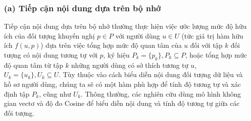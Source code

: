 \subsubsection*{(a) Tiếp cận nội dung dựa trên bộ nhớ}
Tiếp cận nội dung dựa trên bộ nhớ thường thực hiện việc ước lượng mức độ hữu ích của đối tượng khuyến nghị $p \in P$ với người dùng $u \in U$ (tức giá trị hàm hữu ích $f(u,p)$) dựa trên việc tổng hợp mức độ quan tâm của $u$ đối với tập $k$ đối tượng có nội dung tương tự với $p$, ký hiệu $P_{k} = \{p_{k}\}, P_{k} \subseteq P$, hoặc tổng hợp mức độ quan tâm từ tập $k$ những người dùng có sở thích tương tự $u$, $U_{k} = \{u_{k}\}, U_{k} \subseteq U$. Tùy thuộc vào cách biểu diễn nội dung đối tượng dữ liệu và hồ sơ người dùng, chúng ta sẽ có một hàm phù hợp để tính độ tương tự và xác định tập $P_{k}$, cũng như $U_{k}$. Thông thường, các nghiên cứu dùng mô hình không gian vectơ và độ đo Cosine để biểu diễn nội dung và tính độ tương tự giữa các đối tượng. 

